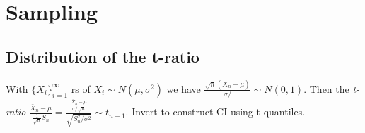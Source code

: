 \section{Sampling}
\subsection{Distribution of the t-ratio}
With $\{X_i\}_{i=1}^\infty$ rs of $X_i\sim N(\mu, \sigma^2)$ we have $\frac{\sqrt{n}(\bar{X}_n-\mu)}{\sigma/} \sim N(0,1)$. Then the \textit{t-ratio} $\frac{\bar{X}_n-\mu}{\frac{1}{\sqrt{n}}S_n} = \frac{\frac{\bar{X}_n-\mu}{\sigma/\sqrt{n}}}{\sqrt{S_n^2/\sigma^2}}\sim t_{n-1}$. Invert to construct CI using t-quantiles.\\